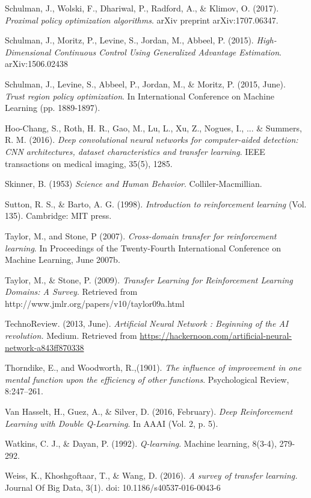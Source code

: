 \begin{thebibliography}{99}
\bibitem{} Schulman, J., Wolski, F., Dhariwal, P., Radford, A., \& Klimov, O. (2017). \textit{Proximal policy
optimization algorithms}. arXiv preprint arXiv:1707.06347.

\bibitem{} Schulman, J., Moritz, P., Levine, S., Jordan, M., Abbeel, P. (2015). \textit{High-Dimensional Continuous Control Using Generalized Advantage Estimation}. arXiv:1506.02438

\bibitem{} Schulman, J., Levine, S., Abbeel, P., Jordan, M., \& Moritz, P. (2015, June). \textit{Trust region policy optimization}. In International Conference on Machine Learning (pp. 1889-1897).

\bibitem{} Hoo-Chang, S., Roth, H. R., Gao, M., Lu, L., Xu, Z., Nogues, I., ... \& Summers, R. M. (2016).\textit{ Deep convolutional neural networks for computer-aided detection: CNN architectures, dataset characteristics and transfer learning}. IEEE transactions on medical imaging, 35(5), 1285.

\bibitem{} Skinner, B. (1953) \textit{Science and Human Behavior}. Colliler-Macmillian.

\bibitem{} Sutton, R. S., \& Barto, A. G. (1998).\textit{ Introduction to reinforcement learning} (Vol. 135).
Cambridge: MIT press.

\bibitem{} Taylor, M., and Stone, P (2007). \textit{Cross-domain transfer for reinforcement learning}. In Proceedings of the Twenty-Fourth International Conference on Machine Learning, June 2007b.

\bibitem{} Taylor, M., \& Stone, P. (2009).\textit{ Transfer Learning for Reinforcement Learning Domains: A Survey}. Retrieved from http://www.jmlr.org/papers/v10/taylor09a.html

\bibitem{} TechnoReview. (2013, June).\textit{ Artificial Neural Network : Beginning of the AI revolution.}
Medium. Retrieved from \url{https://hackernoon.com/artificial-neural-network-a843ff870338}

\bibitem{} Thorndike, E., and Woodworth, R.,(1901). \textit{The influence of improvement in one mental function upon the efficiency of other functions}. Psychological Review, 8:247–261.

\bibitem{} Van Hasselt, H., Guez, A., \& Silver, D. (2016, February). \textit{Deep Reinforcement Learning with
Double Q-Learning}. In AAAI (Vol. 2, p. 5).

\bibitem{} Watkins, C. J., \& Dayan, P. (1992).\textit{ Q-learning}. Machine learning, 8(3-4), 279-292.

\bibitem{} Weiss, K., Khoshgoftaar, T., \& Wang, D. (2016). \textit{A survey of transfer learning.} Journal Of Big Data, 3(1). doi: 10.1186/s40537-016-0043-6


\end{thebibliography}
